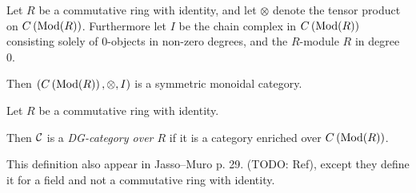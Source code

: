 \begin{fact}[nlab]
    Let \( R \) be a commutative ring with identity, and let \( \otimes \) denote the tensor product on \( C \left( \operatorname{Mod}(R) \right) \). Furthermore let \( I \) be the chain complex in \( C \left( \operatorname{Mod}(R) \right) \) consisting solely of \( 0 \)-objects in non-zero degrees, and the \( R \)-module \( R \) in degree 0. 

    Then \( \left( C \left( \operatorname{Mod}(R) \right), \otimes, I \right) \) is a symmetric monoidal category.
\end{fact}

\begin{definition}%
    Let \( R \) be a commutative ring with identity.

    Then \( {\mathcal{C}} \) is a \emph{DG-category over \( R \)} if it is a category enriched over \( C \left( \operatorname{Mod}(R) \right) \).
\end{definition}
This definition also appear in Jasso--Muro p. 29. (TODO: Ref), except they define it for a field and not a commutative ring with identity.


    



